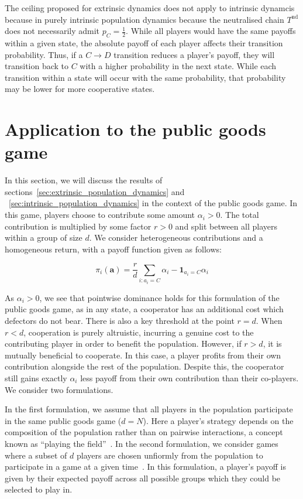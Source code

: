 \documentclass{article}
\begin{document}
The ceiling proposed for extrinsic dynamics does not apply to intrinsic dynamcis
because in purely intrinsic population dynamics because the neutralised chain
\(T^{\mathrm{nd}}\) does not necessarily admit \(p_C = \frac{1}{2}\). While all
players would have the same payoffs within a given state, the absolute payoff of
each player affects their transition probability. Thus, if a \(C \to D\)
transition reduces a player's payoff, they will transition back to \(C\) with a
higher probability in the next state. While each transition within a state will
occur with the same probability, that probability may be lower for more
cooperative states.

\section{Application to the public goods game}\label{sec:pgg}

In this section, we will discuss the results of
sections~\ref{sec:extrinsic_population_dynamics} and
~\ref{sec:intrinsic_population_dynamics} in the context of the public goods
game. In this game, players choose to contribute some amount \(\alpha_i > 0\).
The total contribution is multiplied by some factor \(r > 0\) and split between
all players within a group of size \(d\). We consider heterogeneous
contributions and a homogeneous return, with a payoff function given as follows:

\begin{equation}
    \pi_i(\mathbf{a}) = \frac{r}{d}\sum_{i:a_i=C} \alpha_i - \mathbf{1}_{a_i = C}\alpha_i
    \label{eq:pgg_payoff}
\end{equation}

As \(\alpha_i > 0\), we see that pointwise dominance holds for this formulation
of the public goods game, as in any state, a cooperator has an additional cost
which defectors do not bear. There is also a key threshold at the point \(r=d\).
When \(r<d\), cooperation is purely altruistic, incurring a genuine cost to the
contributing player in order to benefit the population. However, if \(r>d\), it
is mutually beneficial to cooperate. In this case, a player profits from their
own contribution alongside the rest of the population. Despite this, the
cooperator still gains exactly \(\alpha_i\) less payoff from their own
contribution than their co-players. We consider two formulations.

In the first formulation, we assume that all players in the population
participate in the same public goods game (\(d = N\)). Here a player's strategy
depends on the composition of the population rather than on pairwise
interactions, a concept known as ``playing the
field''~\cite{smith_evolution_1982}. In the second formulation, we consider
games where a subset of \(d\) players are chosen unfiormly from the population
to participate in a game at a given time~\cite{multiverse}. In this formulation,
a player's payoff is given by their expected payoff across all possible groups
which they could be selected to play in. 
\end{document}
